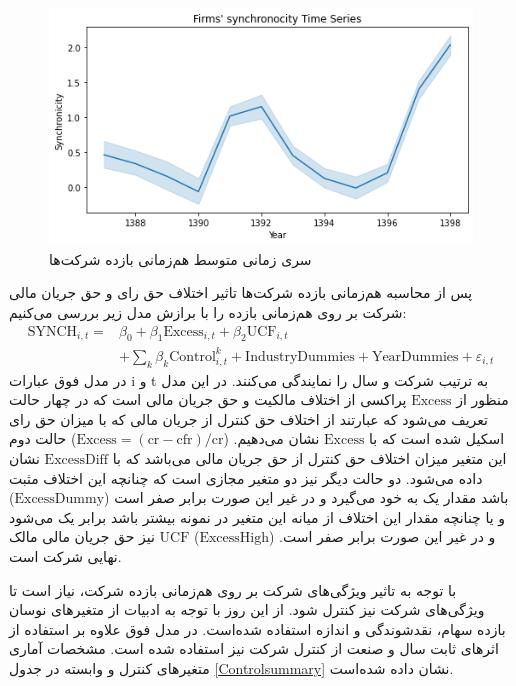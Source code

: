 \documentclass[12pt, a4paper]{article}
\begin{document}
  
  \begin{figure}[htbp]
  	\centering
  	\includegraphics[width=0.85\linewidth]{SYNCHtimeSeries}
  	\caption{سری زمانی متوسط هم‌زمانی بازده شرکت‌ها }
  	\label{fig:synchtimeseries}
  \end{figure}
  
  پس از محاسبه هم‌زمانی بازده شرکت‌ها تاثیر اختلاف حق رای و حق جریان مالی شرکت‌ بر روی هم‌زمانی بازده را با برازش مدل زیر بررسی می‌کنیم:
  \begin{equation}\label{e2}
  	\begin{split}
  		\text{SYNCH}_{i,t} =&  \beta_0 + \beta_1 \text{Excess}_{i,t} + \beta_2 \text{UCF}_{i,t} \\
  		& + \sum_{k} \beta_k \text{Control}_{i,t}^k + \text{IndustryDummies} + \text{YearDummies} + \varepsilon_{i,t}
  	\end{split}
  \end{equation}
در مدل فوق عبارات i و t به ترتیب شرکت و سال را نمایندگی می‌کنند. در این مدل منظور از 
$ \text{Excess} $
پراکسی از اختلاف مالکیت و حق جریان مالی است که در چهار حالت تعریف می‌شود که عبارتند از اختلاف حق کنترل از جریان مالی  که با میزان حق رای اسکیل شده است که با 
$ \text{Excess} $
 نشان می‌دهیم.
($ \text{Excess} = (\text{cr} - \text{cfr})/\text{cr}$)  
حالت دوم این متغیر میزان اختلاف حق کنترل از حق جریان مالی می‌باشد که با 
$ \text{ExcessDiff} $
نشان داده می‌شود. دو حالت دیگر نیز دو متغیر مجازی است که چنانچه این اختلاف مثبت باشد مقدار یک به خود می‌گیرد و در غیر این صورت برابر صفر است 
 ($ \text{ExcessDummy} $)
و یا چنانچه مقدار این اختلاف از میانه این متغیر در نمونه بیشتر باشد برابر یک می‌شود و در غیر این صورت برابر صفر است.
 ($ \text{ExcessHigh} $)
$ \text{UCF} $ 
نیز حق جریان مالی مالک نهایی شرکت است. 

با توجه به تاثیر ویژگی‌های شرکت بر روی هم‌زمانی بازده شرکت، نیاز است تا ویژگی‌های شرکت نیز کنترل شود. از این روز با توجه به ادبیات از متغیر‌های نوسان بازده سهام، نقدشوندگی و اندازه استفاده شده‌است. 
در مدل فوق علاوه بر استفاده از اثر‌های ثابت سال و صنعت از کنترل شرکت نیز استفاده شده است. مشخصات آماری متغیر‌های کنترل و وابسته در جدول 
\ref{Controlsummary}
نشان داده شده‌است.
\end{document}
